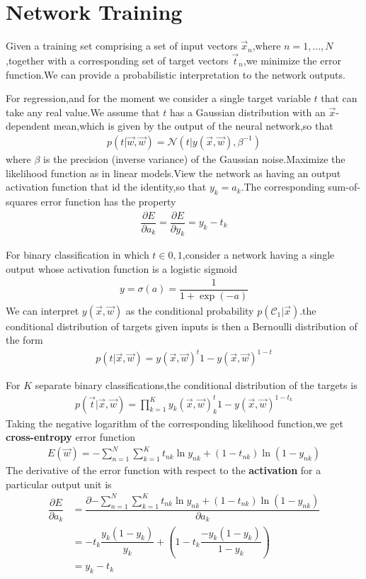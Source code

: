 \section{Network Training}
Given a training set comprising a set of input vectors ${\vec{x}_n}$,where $n=1,...,N$,together with a corresponding set of target vectors ${\vec{t}_n}$,we minimize the error function.We can provide a probabilistic interpretation to the network outputs.

For regression,and for the moment we consider a single target variable $t$ that can take any real value.We assume that $t$ has a Gaussian distribution with an $\vec{x}$-dependent mean,which is given by the output of the neural network,so that
\begin{align}
p(t|\vec{w},\vec{w})=\mathcal{N}(t|y(\vec{x},\vec{w}),\beta^{-1})
\end{align}
where $\beta$ is the precision (inverse variance) of the Gaussian noise.Maximize the likelihood function as in linear models.View the network as having an output activation function that id the identity,so that $y_k=a_k$.The corresponding sum-of-squares error function has the property
\begin{align}\label{eqn:output activation function derivative}
\dfrac{\partial E}{\partial a_k}=\dfrac{\partial E}{\partial y_k}=y_k - t_k
\end{align}

For binary classification in which $t\in{0,1}$,consider a network having a single output whose activation function is a logistic sigmoid
\begin{align}
y=\sigma(a)=\dfrac{1}{1+\exp(-a)}
\end{align}
We can interpret $y(\vec{x},\vec{w})$ as the conditional probability $p(\mathcal{C}_1|\vec{x})$.the conditional distribution of targets given inputs is then a Bernoulli distribution of the form
\begin{align}
p(t|\vec{x},\vec{w})=y(\vec{x},\vec{w})^t{1-y(\vec{x},\vec{w})}^{1-t}
\end{align}

For $K$ separate binary classifications,the conditional distribution of the targets is
\begin{align}
p(\vec{t}|\vec{x},\vec{w})=\prod_{k=1}^{K}y_k(\vec{x},\vec{w})^t_k{1-y(\vec{x},\vec{w})}^{1-t_k}
\end{align}
Taking the negative logarithm of the corresponding likelihood function,we get \textbf{cross-entropy} error function
\begin{align}
E(\vec{w})=-\sum_{n=1}^{N}\sum_{k=1}^{K}{t_{nk}\ln y_{nk}+(1-t_{nk})\ln(1-y_{nk})}
\end{align}
The derivative of the error function with respect to the \textbf{activation} for a particular output unit is
\begin{align}
\dfrac{\partial E}{\partial a_k}
&=\dfrac{\partial {-\sum_{n=1}^{N}\sum_{k=1}^{K}{t_{nk}\ln y_{nk}+(1-t_{nk})\ln(1-y_{nk})} }}{\partial a_k} \\
&=-{t_{k} \dfrac{y_{k}(1-y_{k})}{y_{k}} +(1-t_{k}\dfrac{-y_{k}(1-y_{k})}{1-y_{k}}) } \\
&={y_{k}-t_{k}}
\end{align}

